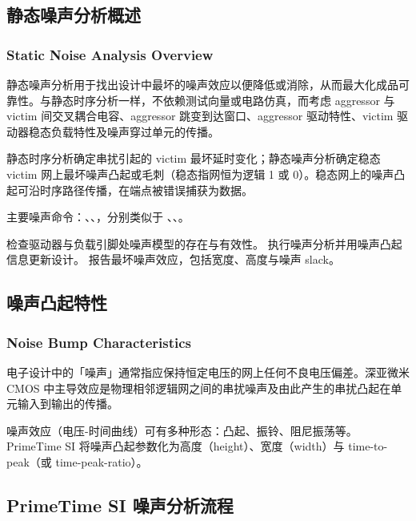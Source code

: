 \subsection{静态噪声分析概述}
\subsubsection*{Static Noise Analysis Overview}

静态噪声分析用于找出设计中最坏的噪声效应以便降低或消除，从而最大化成品可靠性。与静态时序分析一样，不依赖测试向量或电路仿真，而考虑 aggressor 与 victim 间交叉耦合电容、aggressor 跳变到达窗口、aggressor 驱动特性、victim 驱动器稳态负载特性及噪声穿过单元的传播。


静态时序分析确定串扰引起的 victim 最坏延时变化；静态噪声分析确定稳态 victim 网上最坏噪声凸起或毛刺（稳态指网恒为逻辑 1 或 0）。稳态网上的噪声凸起可沿时序路径传播，在端点被错误捕获为数据。

主要噪声命令：、、，分别类似于 、、。


 检查驱动器与负载引脚处噪声模型的存在与有效性。 执行噪声分析并用噪声凸起信息更新设计。 报告最坏噪声效应，包括宽度、高度与噪声 slack。

\subsection{噪声凸起特性}
\subsubsection*{Noise Bump Characteristics}

电子设计中的「噪声」通常指应保持恒定电压的网上任何不良电压偏差。深亚微米 CMOS 中主导效应是物理相邻逻辑网之间的串扰噪声及由此产生的串扰凸起在单元输入到输出的传播。

噪声效应（电压-时间曲线）可有多种形态：凸起、振铃、阻尼振荡等。PrimeTime SI 将噪声凸起参数化为高度（height）、宽度（width）与 time-to-peak（或 time-peak-ratio）。

\subsection{PrimeTime SI 噪声分析流程}
